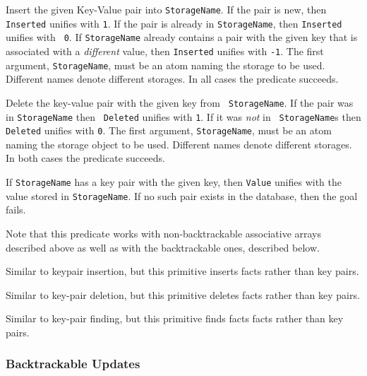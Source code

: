 \begin{description}
Insert the given Key-Value pair into {\tt StorageName}.  If the pair
is new, then {\tt Inserted} unifies with {\tt 1}. If the pair is
already in {\tt StorageName}, then {\tt Inserted} unifies with {\tt
  0}. If {\tt StorageName} already contains a pair with the given key
that is associated with a \emph{different} value, then {\tt Inserted}
unifies with {\tt -1}.  The first argument, {\tt StorageName}, must be
an atom naming the storage to be used. Different names denote
different storages.  In all cases the predicate succeeds.

Delete the key-value pair with the given key from {\tt
  StorageName}. If the pair was in {\tt StorageName} then {\tt
  Deleted} unifies with {\tt 1}.  If it was \emph{not} in {\tt
  StorageName}s then {\tt Deleted} unifies with {\tt 0}.  The first
argument, {\tt StorageName}, must be an atom naming the storage object
to be used. Different names denote different storages.  In both cases
the predicate succeeds.

If {\tt StorageName} has a key pair with the given key, then {\tt Value} unifies
with the value stored in {\tt StorageName}. If no such pair exists in the
database, then the goal fails.

Note that this predicate works with non-backtrackable associative arrays
described above as well as with the backtrackable ones, described below.

Similar to keypair insertion, but this primitive inserts facts rather than
key pairs.

Similar to key-pair deletion, but this primitive deletes facts rather than
key pairs.

Similar to key-pair finding, but this primitive finds facts facts rather than
key pairs.
\end{description}

\subsubsection{Backtrackable Updates}
\label{backtrackable update}

